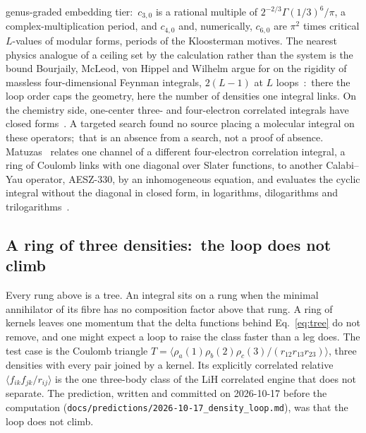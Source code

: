 \documentclass[aps,pra,twocolumn,superscriptaddress,longbibliography]{revtex4-2}
\begin{document}
genus-graded embedding tier:\ $c_{3,0}$ is a rational multiple of $2^{-2/3}\Gamma(1/3)^6/\pi$, a
complex-multiplication period, and $c_{4,0}$ and, numerically, $c_{6,0}$
are $\pi^2$ times critical $L$-values of modular forms, periods of the
Kloosterman motives.  The nearest
physics analogue of a ceiling set by the calculation rather than the
system is the bound Bourjaily, McLeod, von Hippel and Wilhelm argue for on the
rigidity of massless four-dimensional Feynman integrals, $2(L-1)$ at $L$
loops~\cite{bourjaily2019}:\ there the loop order caps the geometry, here
the number of densities one integral links.  On the chemistry side,
one-center three- and four-electron correlated integrals have closed
forms~\cite{fromm_hill1987,padhy2017}.  A targeted search found no source placing a
molecular integral on these operators;\ that is an absence from a search,
not a proof of absence.  Matuzas~\cite{matuzas2026} relates one channel of
a different four-electron correlation integral, a ring of Coulomb links
with one diagonal over Slater functions, to another Calabi--Yau operator,
AESZ-330, by an inhomogeneous equation, and evaluates the cyclic integral
without the diagonal in closed form, in logarithms, dilogarithms and
trilogarithms~\cite{matuzas2026cyclic}.

\subsection{A ring of three densities:\ the loop does not climb}
\label{sec:density_ring}

Every rung above is a tree.  An integral sits on a rung when the minimal
annihilator of its fibre has no composition factor above that rung.  A
ring of kernels leaves one momentum that the delta functions behind
Eq.~\eqref{eq:tree} do not remove, and one might expect a loop to raise the
class faster than a leg does.  The test case is the Coulomb triangle
$T=\langle\rho_a(1)\rho_b(2)\rho_c(3)/(r_{12}r_{13}r_{23})\rangle$, three
densities with every pair joined by a kernel.  Its explicitly correlated
relative $\langle f_{ik}f_{jk}/r_{ij}\rangle$ is the one three-body class of
the LiH correlated engine that does not separate.  The prediction, written
and committed on 2026-10-17 before the computation
(\texttt{docs/predictions/2026-10-17\_density\_loop.md}), was that the loop
does not climb.
\end{document}
